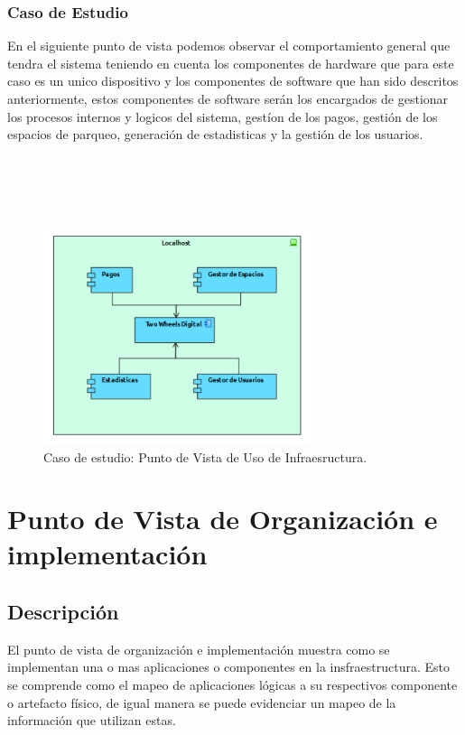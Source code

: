 \subsubsection{Caso de Estudio}
En el siguiente punto de vista podemos observar el comportamiento general que tendra el sistema teniendo en cuenta los componentes de hardware que para este caso es un unico dispositivo y los componentes de software que han sido descritos anteriormente, estos componentes de software serán los encargados de gestionar los procesos internos y logicos del sistema, gestíon de los pagos, gestión de los espacios de parqueo, generación de estadisticas y la gestión de los usuarios.\\
\\
\\
\\
\\
\begin{figure}[h]
	\centering
	\includegraphics[width=0.7\textwidth]{imagenes/Caso_Estudio/Tecnologia/uso_infraestructura.PDF}
	\caption{Caso de estudio: Punto de Vista de Uso de Infraesructura.}
	\label{fig:gap_analysis}
\end{figure}


\section{Punto de Vista de Organización e implementación}
\subsection{Descripción}
El punto de vista de organización e implementación muestra como se implementan una o mas aplicaciones o componentes en la insfraestructura. Esto se comprende como el mapeo de aplicaciones lógicas a su respectivos componente o artefacto físico, de igual manera se puede evidenciar un mapeo de  la información que utilizan estas.

